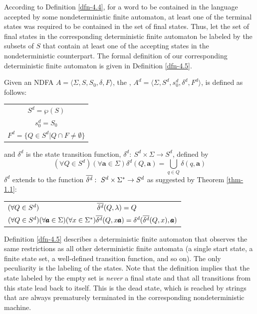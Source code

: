 According to Definition \ref{dfn-4.4}, for a word to be contained in the language accepted
by some nondeterministic finite automaton, at least one of the terminal states
was required to be contained in the set of final states. Thus, let the set of
final states in the corresponding deterministic finite automaton be labeled by
the subsets of $S$ that contain at least one of the accepting states in the
nondeterministic counterpart. The formal definition of our corresponding
deterministic finite automaton is given in Definition \ref{dfn-4.5}.

\begin{dfn}\label{dfn-4.5}
Given an NDFA $A=\langle\Sigma,S,S_0,\delta,F\rangle$, the
\emph{}, $A^d=\langle\Sigma,
S^d,s^d_0,\delta^d,F^d\rangle$, is defined as follows:
\begin{center}\begin{tabular}{c}
$S^d = \wp(S)$ \\
$s^d_0 = S_0$ \\
$F^d = \{Q \in S^d|Q \cap F \not= \emptyset\}$
\end{tabular}\end{center}
and $\delta^d$ is the state transition function, $\delta^d$$:\ S^d \times \Sigma
\rightarrow S^d$, defined by
\[ (\forall Q \in S^d)(\forall\pmb{a}\in\Sigma)\delta^d(Q,\pmb{a}) =
	\bigcup\limits_{q\in Q} \delta(q,\pmb{a}) \]
$\delta^d$ extends to the function $\overline{\delta^{d}}:\ S^d \times \Sigma^* \rightarrow
S^d$ as suggested by Theorem \ref{thm-1.1}:
\begin{center}\begin{tabular}{l}
$(\forall Q \in S^d)\qquad\qquad\qquad\qquad\ \overline{\delta^{d}}(Q,\lambda) = Q$ \\
$(\forall Q \in S^d)(\forall\pmb{a}\in\Sigma)(\forall x \in
	\Sigma^*)\overline{\delta^{d}}(Q,x\pmb{a}) = \delta^d(\overline{\delta^{d}}(Q,x),\pmb{a})$
\end{tabular}\end{center}
\end{dfn}

Definition \ref{dfn-4.5} describes a deterministic finite automaton that observes the
same restrictions as all other deterministic finite automata (a single start
state, a finite state set, a well-defined transition function, and so on). The
only peculiarity is the labeling of the states. Note that the definition implies
that the state labeled by the empty set is \emph{never} a final state and that
all transitions from this state lead back to itself. This is the dead state,
which is reached by strings that are always prematurely terminated in the
corresponding nondeterministic machine.

